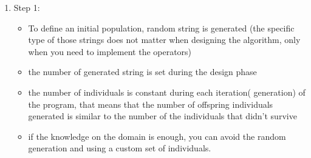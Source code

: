 \documentclass{article}
\begin{document}
\begin{enumerate}
    \item Step 1: 
    \newline
        \begin{itemize}
            \item To define an initial population, random string is generated (the specific type of those strings does not matter when designing the algorithm, only when you need to implement the operators)
            \item the number of generated string is set during the design phase
            \item the number of individuals is constant during each iteration( generation) of the program, that means that the number of offspring individuals generated is similar to the number of the individuals that didn't survive
            \item if the knowledge on the domain is enough, you can avoid the random generation and using a custom set of individuals.
            \end{itemize}
            

\end{enumerate}
\end{document}
